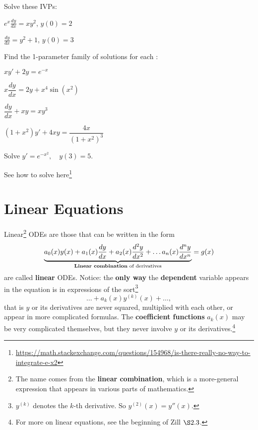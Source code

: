\begin{question}
Solve these IVPs:
  \begin{colenumerate}
  \item $e^x\frac{dy}{dx} = xy^2$, $y(0)=2$
  \item $\frac{dy}{dx} = y^2 +1$, $y(0) = 3$
\end{colenumerate}
\end{question}

\begin{question}
 Find the 1-parameter family of solutions for each \ode{}:
  \begin{colenumerate}
  \item $xy'+2y=e^{-x}$
  \item $x\dfrac{dy}{dx}=2y+x^4\sin(x^2)$
  \item $\dfrac{dy}{dx}+xy = xy^3$
  \item $(1+x^2)y' + 4xy = \dfrac{4x}{(1+x^2)^3}$
  \end{colenumerate}
\end{question}


\begin{question}
    Solve \(y' = e^{-x^2}, \quad y(3)=5.\)
\end{question}
\noindent See how to solve here\footnote{\url{https://math.stackexchange.com/questions/154968/is-there-really-no-way-to-integrate-e-x2}}




\section{Linear Equations}
Linear\footnote{The name comes from the \textbf{linear combination}, which is a more-general expression that appears in various parts of mathematics.} ODEs are those that can be written in the form
\[
\underbrace{a_{0}(x)y(x) + a_{1}(x)\frac{dy}{dx} + a_{2}(x)\frac{d^{2}y}{dx^{2}} + \dots a_{n}(x)\frac{d^{n}y}{dx^n}}_{\text{\textbf{Linear combination} of derivatives}} = g(x)
\]
are called \textbf{linear} ODEs. Notice: the \textbf{only way} the \textbf{dependent} variable appears in the equation is in expressions of the sort\footnote{\(y^{(k)}\) denotes the \(k\)-th derivative. So \(y^{(2)}(x) = y''(x)\).}
\[
  \dots + a_{k}(x) y^{(k)}(x) + \dots,
\]
that is \(y\) or its derivatives are never squared, multiplied with each other, or appear in more complicated formulas. The \textbf{coefficient functions} \(a_{k}(x)\) may be very complicated themselves, but they never involve \(y\) or its derivatives.\footnote{For more on linear equations, see the beginning of Zill \(\S 2.3\).}

